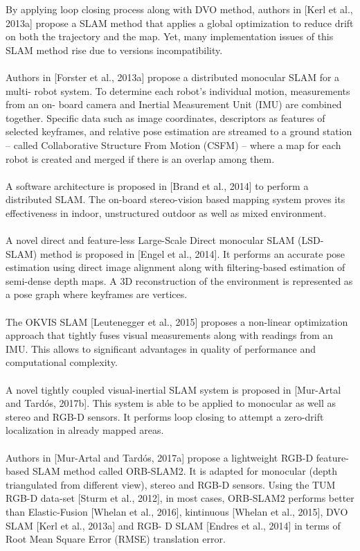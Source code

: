 By applying loop closing process along with DVO method, authors in [Kerl et al., 2013a] propose a SLAM method that applies a global optimization to reduce drift on both the trajectory and the map. Yet, many implementation issues of this SLAM method rise due to versions incompatibility.\\\\
Authors in [Forster et al., 2013a] propose a distributed monocular SLAM for a multi- robot system. To determine each robot’s individual motion, measurements from an on- board camera and Inertial Measurement Unit (IMU) are combined together. Speciﬁc data such as image coordinates, descriptors as features of selected keyframes, and relative pose estimation are streamed to a ground station – called Collaborative Structure From Motion (CSFM) – where a map for each robot is created and merged if there is an overlap among them.\\\\
A software architecture is proposed in [Brand et al., 2014] to perform a distributed SLAM. The on-board stereo-vision based mapping system proves its eﬀectiveness in indoor, unstructured outdoor as well as mixed environment.\\\\
A novel direct and feature-less Large-Scale Direct monocular SLAM (LSD-SLAM) method is proposed in [Engel et al., 2014]. It performs an accurate pose estimation using direct image alignment along with ﬁltering-based estimation of semi-dense depth maps. A 3D reconstruction of the environment is represented as a pose graph where keyframes are vertices.\\\\
The OKVIS SLAM [Leutenegger et al., 2015] proposes a non-linear optimization approach that tightly fuses visual measurements along with readings from an IMU. This allows to signiﬁcant advantages in quality of performance and computational complexity.\\\\
A novel tightly coupled visual-inertial SLAM system is proposed in [Mur-Artal and Tardós, 2017b]. This system is able to be applied to monocular as well as stereo and RGB-D sensors. It performs loop closing to attempt a zero-drift localization in already mapped areas.\\\\
Authors in [Mur-Artal and Tardós, 2017a] propose a lightweight RGB-D feature-based SLAM method called ORB-SLAM2. It is adapted for monocular (depth triangulated from diﬀerent view), stereo and RGB-D sensors. Using the TUM RGB-D data-set [Sturm et al., 2012], in most cases, ORB-SLAM2 performs better than Elastic-Fusion [Whelan et al., 2016], kintinuous [Whelan et al., 2015], DVO SLAM [Kerl et al., 2013a] and RGB- D SLAM [Endres et al., 2014] in terms of Root Mean Square Error (RMSE) translation error.\\\\
